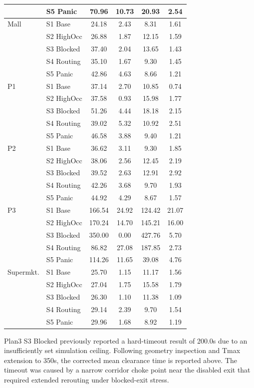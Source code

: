 \documentclass[nolineno]{ieeeaccess}
\begin{document}
\begin{table}[t]
{\begin{tabular}{>{\raggedright\arraybackslash}p{1.15cm}>{\raggedright\arraybackslash}p{1.30cm}cccc}
 & S5 Panic & 70.96 & 10.73 & 20.93 & 2.54 \\
\midrule
Mall & S1 Base & 24.18 & 2.43 & 8.31 & 1.61 \\
 & S2 HighOcc & 26.88 & 1.87 & 12.15 & 1.59 \\
 & S3 Blocked & 37.40 & 2.04 & 13.65 & 1.43 \\
 & S4 Routing & 35.10 & 1.67 & 9.30 & 1.45 \\
 & S5 Panic & 42.86 & 4.63 & 8.66 & 1.21 \\
\midrule
P1 & S1 Base & 37.14 & 2.70 & 10.85 & 0.74 \\
 & S2 HighOcc & 37.58 & 0.93 & 15.98 & 1.77 \\
 & S3 Blocked & 51.26 & 4.44 & 18.18 & 2.15 \\
 & S4 Routing & 39.02 & 5.32 & 10.92 & 2.51 \\
 & S5 Panic & 46.58 & 3.88 & 9.40 & 1.21 \\
\midrule
P2 & S1 Base & 36.62 & 3.11 & 9.30 & 1.85 \\
 & S2 HighOcc & 38.06 & 2.56 & 12.45 & 2.19 \\
 & S3 Blocked & 39.52 & 2.63 & 12.91 & 2.92 \\
 & S4 Routing & 42.26 & 3.68 & 9.70 & 1.93 \\
 & S5 Panic & 44.92 & 4.29 & 8.67 & 1.57 \\
\midrule
P3 & S1 Base & 166.54 & 24.92 & 124.42 & 21.07 \\
 & S2 HighOcc & 170.24 & 14.70 & 145.21 & 16.00 \\
 & S3 Blocked & 350.00 & 0.00 & 427.76 & 5.70 \\
 & S4 Routing & 86.82 & 27.08 & 187.85 & 2.73 \\
 & S5 Panic & 114.26 & 11.65 & 39.08 & 4.76 \\
\midrule
Supermkt. & S1 Base & 25.70 & 1.15 & 11.17 & 1.56 \\
 & S2 HighOcc & 27.04 & 1.75 & 15.58 & 1.79 \\
 & S3 Blocked & 26.30 & 1.10 & 11.38 & 1.09 \\
 & S4 Routing & 29.14 & 2.39 & 9.70 & 1.54 \\
 & S5 Panic & 29.96 & 1.68 & 8.92 & 1.19 \\
\bottomrule
\end{tabular}
}
\end{table}

{\footnotesize Plan3 S3 Blocked previously reported a hard-timeout result of 200.0s due to an insufficiently set simulation ceiling. Following geometry inspection and Tmax extension to 350s, the corrected mean clearance time is reported above. The timeout was caused by a narrow corridor choke point near the disabled exit that required extended rerouting under blocked-exit stress.}
\end{document}
